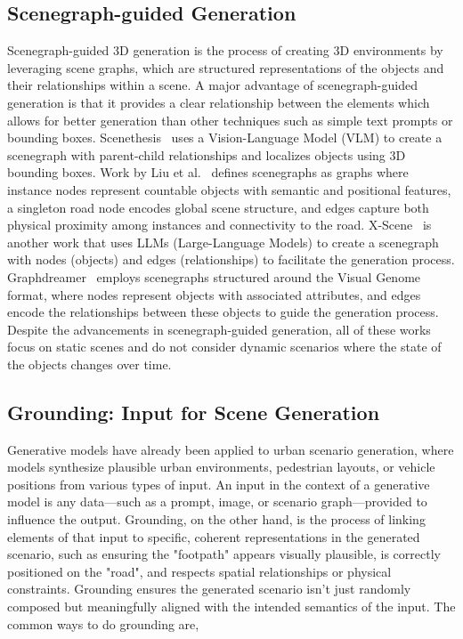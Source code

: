 \documentclass{article}
\begin{document}
\subsection{Scenegraph-guided Generation}

Scenegraph-guided 3D generation is the process of creating 3D environments by leveraging scene graphs, which are structured representations of the objects and their relationships within a scene. A major advantage of scenegraph-guided generation is that it provides a clear relationship between the elements which allows for better generation than other techniques such as simple text prompts or bounding boxes. Scenethesis~\cite{ling2025scenethesis} uses a Vision-Language Model (VLM) to create a scenegraph with parent-child relationships and localizes objects using 3D bounding boxes. Work by Liu et al.~\cite{liu2025controllable} defines scenegraphs as graphs where instance nodes represent countable objects with semantic and positional features, a singleton road node encodes global scene structure, and edges capture both physical proximity among instances and connectivity to the road. X-Scene~\cite{yang2025x} is another work that uses LLMs (Large-Language Models) to create a scenegraph with nodes (objects) and edges (relationships) to facilitate the generation process. Graphdreamer~\cite{gao2024graphdreamer} employs scenegraphs structured around the Visual Genome~\cite{krishna2017visual} format, where nodes represent objects with associated attributes, and edges encode the relationships between these objects to guide the generation process. Despite the advancements in scenegraph-guided generation, all of these works focus on static scenes and do not consider dynamic scenarios where the state of the objects changes over time.

\subsection{Grounding: Input for Scene Generation}

Generative models have already been applied to urban scenario generation, where models synthesize plausible urban environments, pedestrian layouts, or vehicle positions from various types of input. An input in the context of a generative model is any data—such as a prompt, image, or scenario graph—provided to influence the output. Grounding, on the other hand, is the process of linking elements of that input to specific, coherent representations in the generated scenario, such as ensuring the "footpath" appears visually plausible, is correctly positioned on the "road", and respects spatial relationships or physical constraints. Grounding ensures the generated scenario isn't just randomly composed but meaningfully aligned with the intended semantics of the input. The common ways to do grounding are,
\end{document}
